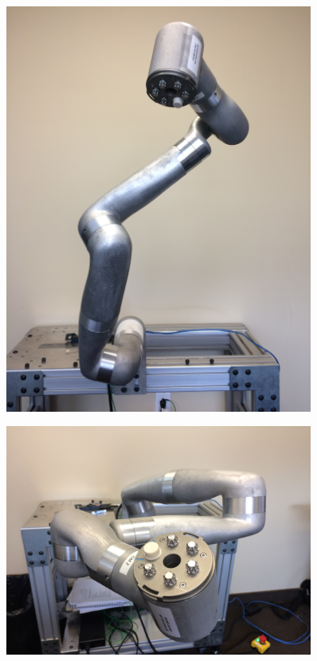 \begin{figure}
	\centering
	\begin{minipage}{.5\textwidth}
		\centering
		\includegraphics[width=0.9\textwidth]{./images/Pose9}
		\label{fig:pose9}
	\end{minipage}%
	\begin{minipage}{.5\textwidth}
		\centering
		\includegraphics[width=0.9\textwidth]{./images/Pose10}
		\label{fig:pose10}
	\end{minipage}
\end{figure}



